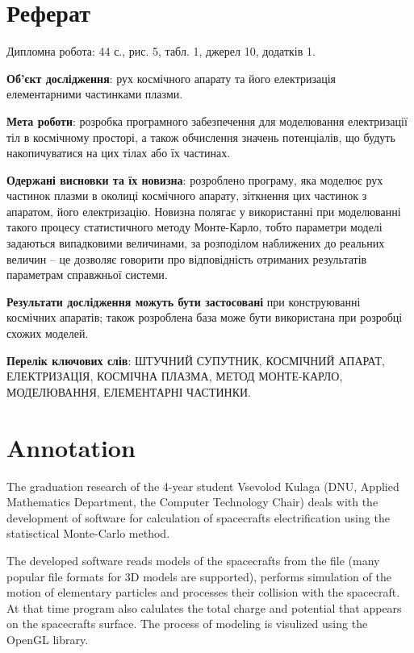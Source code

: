 \documentclass[a4paper,12pt]{article}
\begin{document}
\onehalfspacing
\large

\setcounter{page}{2}

\section*{Реферат}
Дипломна робота: 44 с., рис. 5, табл. 1, джерел 10, додатків 1.

\textbf{Об’єкт дослідження}: рух космічного апарату та його електризація елементарними частинками плазми.

\textbf{Мета роботи}: розробка програмного забезпечення для моделювання електризації тіл в космічному просторі, а також обчислення значень потенціалів, що будуть накопичуватися на цих тілах або їх частинах.

\textbf{Одержані висновки та їх новизна}: розроблено програму, яка моделює рух частинок плазми в околиці космічного апарату, зіткнення цих частинок з апаратом, його електризацію. Новизна полягає у використанні при моделюванні такого процесу статистичного методу Монте-Карло, тобто параметри моделі задаються випадковими величинами, за розподілом наближених до реальних величин -- це дозволяє говорити про відповідність отриманих результатів параметрам справжньої системи.

\textbf{Результати дослідження можуть бути застосовані} при конструюванні космічних апаратів; також розроблена база може бути використана при розробці схожих моделей.

\textbf{Перелік ключових слів}: ШТУЧНИЙ СУПУТНИК, КОСМІЧНИЙ АПАРАТ, ЕЛЕКТРИЗАЦІЯ, КОСМІЧНА ПЛАЗМА, МЕТОД МОНТЕ-КАРЛО, МОДЕЛЮВАННЯ, ЕЛЕМЕНТАРНІ ЧАСТИНКИ.

\newpage

\section*{Annotation}

The graduation research of the 4-year student Vsevolod Kulaga (DNU, Applied Mathematics Department, the Computer Technology Chair) deals with the development of software for calculation of spacecrafts electrification using the statisctical Monte-Carlo method.
 
The developed software reads models of the spacecrafts from the file (many popular file formats for 3D models are supported), performs simulation of the motion of elementary particles and processes their collision with the spacecraft. At that time program also calulates the total charge and potential that appears on the spacecrafts surface. The process of modeling is visulized using the OpenGL library.
\end{document}
